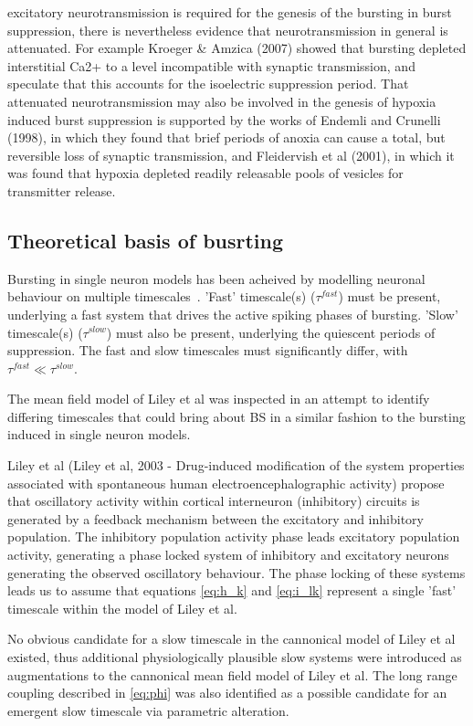 \documentclass[a4paper,12pt]{article}
\begin{document}
excitatory neurotransmission is required for the genesis of the bursting
in burst suppression, there is nevertheless evidence that
neurotransmission in general is attenuated. For example Kroeger \&
Amzica (2007) showed that bursting depleted interstitial Ca2+ to a
level incompatible with synaptic transmission, and speculate that this
accounts for the isoelectric suppression period. That attenuated
neurotransmission may also be involved in the genesis of hypoxia
induced burst suppression is supported by the works of Endemli and
Crunelli (1998), in which they found that brief periods of anoxia can
cause a total, but reversible loss of synaptic transmission, and
Fleidervish et al (2001), in which it was found that hypoxia depleted
readily releasable pools of vesicles for transmitter release.

\subsection{Theoretical basis of busrting}
Bursting in single neuron models has been acheived by modelling neuronal behaviour on multiple timescales~\cite{izikevich2007_1}. 'Fast' timescale(s) ($\tau^{fast}$) must be present, underlying a fast system that drives the active spiking phases of bursting. 'Slow' timescale(s) ($\tau^{slow}$) must also be present, underlying the quiescent periods of suppression. The fast and slow timescales must significantly differ, with $\tau^{fast} \ll \tau^{slow}$. 

The mean field model of Liley et al was inspected in an attempt to identify differing timescales that could bring about BS in a similar fashion to the bursting induced in single neuron models. 

Liley et al (Liley et al, 2003 - Drug-induced modification of the system properties associated
with spontaneous human electroencephalographic activity) propose that oscillatory activity within cortical interneuron
(inhibitory) circuits is generated by a feedback mechanism between the excitatory and inhibitory population.
The inhibitory population activity phase leads excitatory population activity, generating a phase locked system of
inhibitory and excitatory neurons generating the observed oscillatory behaviour. The phase locking of these systems leads us to assume that equations \ref{eq:h_k} and \ref{eq:i_lk} represent a single 'fast'
timescale within the model of Liley et al. 

No obvious candidate for a slow timescale in the cannonical model of Liley et al existed, thus additional physiologically plausible slow systems were introduced as augmentations to the cannonical mean field model of Liley et al. The long range coupling described in \ref{eq:phi} was also identified as a possible candidate for an emergent slow timescale via parametric alteration.
\end{document}
